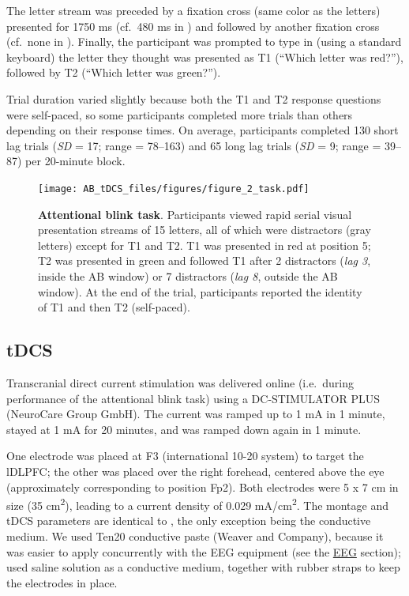 \documentclass[11pt,english,]{memoir}
\begin{document}
The letter stream was preceded by a fixation cross (same color as the letters) presented for 1750 ms (cf.~480 ms in \textcite{London2015}) and followed by another fixation cross (cf.~none in \textcite{London2015}). Finally, the participant was prompted to type in (using a standard keyboard) the letter they thought was presented as T1 (``Which letter was red?''), followed by T2 (``Which letter was green?'').

Trial duration varied slightly because both the T1 and T2 response questions were self-paced, so some participants completed more trials than others depending on their response times. On average, participants completed 130 short lag trials (\emph{SD} = 17; range = 78--163) and 65 long lag trials (\emph{SD} = 9; range = 39--87) per 20-minute block.

\begin{figure}
\centering
\texttt{[image: AB\_tDCS\_files/figures/figure\_2\_task.pdf]}
\caption{\label{fig:AB-tDCS-fig-task}\textbf{Attentional blink task}. Participants viewed rapid serial visual presentation streams of 15 letters, all of which were distractors (gray letters) except for T1 and T2. T1 was presented in red at position 5; T2 was presented in green and followed T1 after 2 distractors (\emph{lag 3}, inside the AB window) or 7 distractors (\emph{lag 8}, outside the AB window). At the end of the trial, participants reported the identity of T1 and then T2 (self-paced).}
\end{figure}



\hypertarget{AB_tDCS-tDCS}{%
\subsection{tDCS}\label{AB_tDCS-tDCS}}

Transcranial direct current stimulation was delivered online (i.e.~during performance of the attentional blink task) using a DC-STIMULATOR PLUS (NeuroCare Group GmbH). The current was ramped up to 1 mA in 1 minute, stayed at 1 mA for 20 minutes, and was ramped down again in 1 minute.

One electrode was placed at F3 (international 10-20 system) to target the lDLPFC; the other was placed over the right forehead, centered above the eye (approximately corresponding to position Fp2). Both electrodes were 5 x 7 cm in size (35 cm\textsuperscript{2}), leading to a current density of 0.029 mA/cm\textsuperscript{2}. The montage and tDCS parameters are identical to \textcite{London2015}, the only exception being the conductive medium. We used Ten20 conductive paste (Weaver and Company), because it was easier to apply concurrently with the EEG equipment (see the \protect\hyperlink{AB_tDCS-EEGdata}{EEG} section); \textcite{London2015} used saline solution as a conductive medium, together with rubber straps to keep the electrodes in place.
\end{document}
